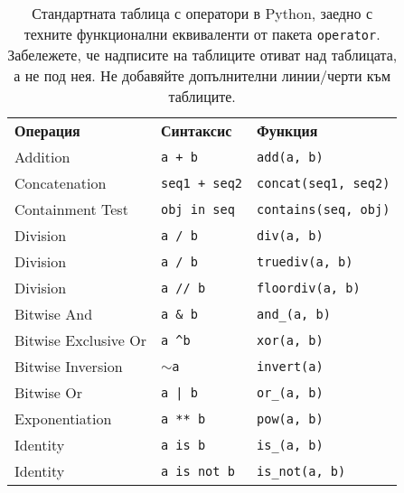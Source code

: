 \begin{table}
    \caption{Стандартната таблица с оператори в Python, заедно с техните функционални еквиваленти от пакета \texttt{operator}. Забележете, че надписите
    на таблиците отиват над таблицата, а не под нея. Не добавяйте допълнителни линии/черти към таблиците.}\label{tab:operators}
    \begin{tabular}{@{}lll@{}}
    \textbf{Операция}    & \textbf{Синтаксис}                & \textbf{Функция}                            \\ %
    Addition              & \texttt{a + b}                          & \texttt{add(a, b)}                                    \\
    Concatenation         & \texttt{seq1 + seq2}                    & \texttt{concat(seq1, seq2)}                           \\
    Containment Test      & \texttt{obj in seq}                     & \texttt{contains(seq, obj)}                           \\
    Division              & \texttt{a / b}                          & \texttt{div(a, b) }  \\
    Division              & \texttt{a / b}                          & \texttt{truediv(a, b) } \\
    Division              & \texttt{a // b}                         & \texttt{floordiv(a, b)}                               \\
    Bitwise And           & \texttt{a \& b}                         & \texttt{and\_(a, b)}                                  \\
    Bitwise Exclusive Or  & \texttt{a \textasciicircum b}           & \texttt{xor(a, b)}                                    \\
    Bitwise Inversion     & \texttt{$\sim$a}                        & \texttt{invert(a)}                                    \\
    Bitwise Or            & \texttt{a | b}                          & \texttt{or\_(a, b)}                                   \\
    Exponentiation        & \texttt{a ** b}                         & \texttt{pow(a, b)}                                    \\
    Identity              & \texttt{a is b}                         & \texttt{is\_(a, b)}                                   \\
    Identity              & \texttt{a is not b}                     & \texttt{is\_not(a, b)}                                \\

\end{tabular}
\end{table}
